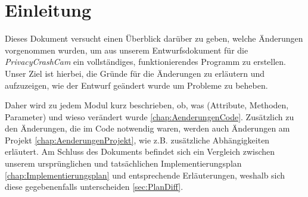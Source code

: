 \chapter{Einleitung} \label{chap:Einleitung}
Dieses Dokument versucht einen Überblick darüber zu geben, welche Änderungen vorgenommen wurden, um aus unserem Entwurfsdokument für die \textit{PrivacyCrashCam} ein vollständiges, funktionierendes Programm zu erstellen. Unser Ziel ist hierbei, die Gründe für die Änderungen zu erläutern und aufzuzeigen, wie der Entwurf geändert wurde um Probleme zu beheben.\par
Daher wird zu jedem Modul kurz beschrieben, ob, was (Attribute, Methoden, Parameter) und wieso verändert wurde \eqref{chap:AenderungenCode}. Zusätzlich zu den Änderungen, die im Code notwendig waren, werden auch Änderungen am Projekt \eqref{chap:AenderungenProjekt}, wie z.B. zusätzliche Abhängigkeiten erläutert.
Am Schluss des Dokuments befindet sich ein Vergleich zwischen unserem ursprünglichen und tatsächlichen Implementierungsplan \eqref{chap:Implementierungsplan} und entsprechende Erläuterungen, weshalb sich diese gegebenenfalls unterscheiden \eqref{sec:PlanDiff}.